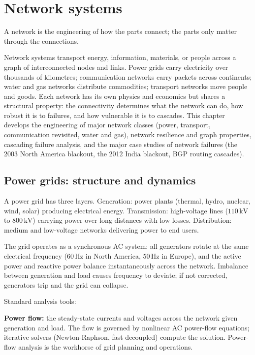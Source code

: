 \chapter{Network systems}
\label{vol09:ch13}

\epigraph{A network is the engineering of how the parts connect; the parts only matter through the connections.}{}


\noindent
Network systems transport energy, information, materials, or people across a graph of interconnected nodes and links. Power grids carry electricity over thousands of kilometres; communication networks carry packets across continents; water and gas networks distribute commodities; transport networks move people and goods. Each network has its own physics and economics but shares a structural property: the connectivity determines what the network can do, how robust it is to failures, and how vulnerable it is to cascades. This chapter develops the engineering of major network classes (power, transport, communication revisited, water and gas), network resilience and graph properties, cascading failure analysis, and the major case studies of network failures (the 2003 North America blackout, the 2012 India blackout, BGP routing cascades).

\section{Power grids: structure and dynamics}

A power grid has three layers. Generation: power plants (thermal, hydro, nuclear, wind, solar) producing electrical energy. Transmission: high-voltage lines ($110\,\text{kV}$ to $800\,\text{kV}$) carrying power over long distances with low losses. Distribution: medium and low-voltage networks delivering power to end users.

The grid operates as a synchronous AC system: all generators rotate at the same electrical frequency ($60\,\text{Hz}$ in North America, $50\,\text{Hz}$ in Europe), and the active power and reactive power balance instantaneously across the network. Imbalance between generation and load causes frequency to deviate; if not corrected, generators trip and the grid can collapse.

Standard analysis tools:

\textbf{Power flow:} the steady-state currents and voltages across the network given generation and load. The flow is governed by nonlinear AC power-flow equations; iterative solvers (Newton-Raphson, fast decoupled) compute the solution. Power-flow analysis is the workhorse of grid planning and operations.

